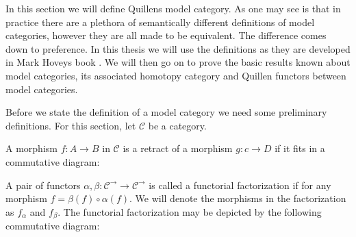 \documentclass[../thesis.tex]{subfiles}
\begin{document}
        In this section we will define Quillens model category. As one may see is that in practice there are a plethora of semantically different definitions of model categories, however they are all made to be equivalent. The difference comes down to preference. In this thesis we will use the definitions as they are developed in Mark Hoveys book . We will then go on to prove the basic results known about model categories, its associated homotopy category and Quillen functors between model categories.

        Before we state the definition of a model category we need some preliminary definitions. For this section, let $\mathcal{C}$ be a category.

        \begin{definition}[Retract]
            A morphism $f:A\rightarrow B$ in $\mathcal{C}$ is a retract of a morphism $g: c\rightarrow D$ if it fits in a commutative diagram:
            \begin{center}
            \end{center}
        \end{definition}

        \begin{definition}
            A pair of functors $\alpha, \beta: \mathcal{C}^\rightarrow\rightarrow\mathcal{C}^\rightarrow$ is called a functorial factorization if for any morphism $f = \beta(f)\circ\alpha(f)$. We will denote the morphisms in the factorization as $f_\alpha$ and $f_\beta$. The functorial factorization may be depicted by the following commutative diagram:
            \begin{center}
            \end{center}
        \end{definition}
\end{document}
